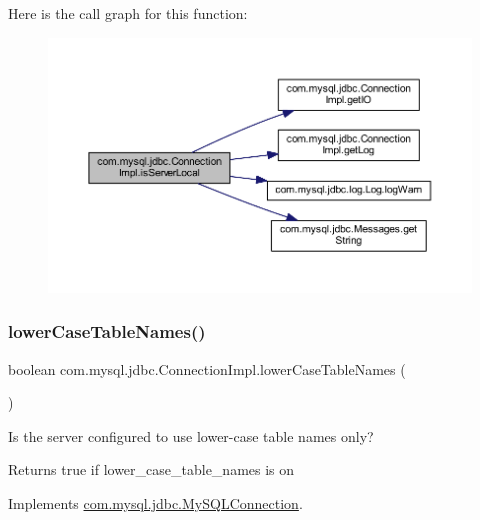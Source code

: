 Here is the call graph for this function\+:\nopagebreak
\begin{figure}[H]
\begin{center}
\leavevmode
\includegraphics[width=350pt]{classcom_1_1mysql_1_1jdbc_1_1_connection_impl_a88cfb69a36df841dccfba314da816213_cgraph}
\end{center}
\end{figure}
\mbox{\label{classcom_1_1mysql_1_1jdbc_1_1_connection_impl_a50a7db180dd968c196dfd94f2bb476fb}} 
\subsubsection{\texorpdfstring{lower\+Case\+Table\+Names()}{lowerCaseTableNames()}}
{\footnotesize\ttfamily boolean com.\+mysql.\+jdbc.\+Connection\+Impl.\+lower\+Case\+Table\+Names (\begin{DoxyParamCaption}{ }\end{DoxyParamCaption})}

Is the server configured to use lower-\/case table names only?

\begin{DoxyReturn}{Returns}
true if lower\+\_\+case\+\_\+table\+\_\+names is \textquotesingle{}on\textquotesingle{} 
\end{DoxyReturn}


Implements \mbox{\hyperlink{interfacecom_1_1mysql_1_1jdbc_1_1_my_s_q_l_connection_a5b25c6fb6c56e77ebc6989179da0dd75}{com.\+mysql.\+jdbc.\+My\+S\+Q\+L\+Connection}}.


